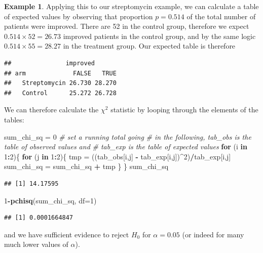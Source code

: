 \documentclass[
  openany]{book}
\newenvironment{Shaded}{\begin{snugshade}}{\end{snugshade}}
\newcommand{\AttributeTok}[1]{\textcolor[rgb]{0.13,0.29,0.53}{#1}}
\newcommand{\CommentTok}[1]{\textcolor[rgb]{0.56,0.35,0.01}{\textit{#1}}}
\newcommand{\ControlFlowTok}[1]{\textcolor[rgb]{0.13,0.29,0.53}{\textbf{#1}}}
\newcommand{\DecValTok}[1]{\textcolor[rgb]{0.00,0.00,0.81}{#1}}
\newcommand{\FunctionTok}[1]{\textcolor[rgb]{0.13,0.29,0.53}{\textbf{#1}}}
\newcommand{\NormalTok}[1]{#1}
\newcommand{\OtherTok}[1]{\textcolor[rgb]{0.56,0.35,0.01}{#1}}
\newcommand{\SpecialCharTok}[1]{\textcolor[rgb]{0.81,0.36,0.00}{\textbf{#1}}}
\theoremstyle{definition}
\theoremstyle{definition}
\newtheorem{example}{Example}[chapter]
\theoremstyle{definition}
\theoremstyle{definition}
\theoremstyle{remark}
\begin{document}
\begin{example}
Applying this to our streptomycin example, we can calculate a table of expected values by observing that proportion \(p=0.514\) of the total number of patients were improved. There are 52 in the control group, therefore we expect \(0.514\times 52 = 26.73\) improved patients in the control group, and by the same logic \(0.514\times 55 = 28.27\) in the treatment group. Our expected table is therefore

\begin{verbatim}
##               improved
## arm             FALSE   TRUE
##   Streptomycin 26.730 28.270
##   Control      25.272 26.728
\end{verbatim}

We can therefore calculate the \(\chi^2\) statistic by looping through the elements of the tables:

\begin{Shaded}
\begin{Highlighting}[]
\NormalTok{sum\_chi\_sq }\OtherTok{=} \DecValTok{0} \CommentTok{\# set a running total going }
\CommentTok{\# in the following, tab\_obs is the table of observed values and}
\CommentTok{\# tab\_exp is the table of expected values}
\ControlFlowTok{for}\NormalTok{ (i }\ControlFlowTok{in} \DecValTok{1}\SpecialCharTok{:}\DecValTok{2}\NormalTok{)\{}
  \ControlFlowTok{for}\NormalTok{ (j }\ControlFlowTok{in} \DecValTok{1}\SpecialCharTok{:}\DecValTok{2}\NormalTok{)\{}
\NormalTok{    tmp }\OtherTok{=}\NormalTok{ ((tab\_obs[i,j] }\SpecialCharTok{{-}}\NormalTok{ tab\_exp[i,j])}\SpecialCharTok{\^{}}\DecValTok{2}\NormalTok{)}\SpecialCharTok{/}\NormalTok{tab\_exp[i,j]}
\NormalTok{    sum\_chi\_sq }\OtherTok{=}\NormalTok{ sum\_chi\_sq }\SpecialCharTok{+}\NormalTok{ tmp}
\NormalTok{  \}}
\NormalTok{\}}
\NormalTok{sum\_chi\_sq}
\end{Highlighting}
\end{Shaded}

\begin{verbatim}
## [1] 14.17595
\end{verbatim}

\begin{Shaded}
\begin{Highlighting}[]
\DecValTok{1}\SpecialCharTok{{-}}\FunctionTok{pchisq}\NormalTok{(sum\_chi\_sq, }\AttributeTok{df=}\DecValTok{1}\NormalTok{)}
\end{Highlighting}
\end{Shaded}

\begin{verbatim}
## [1] 0.0001664847
\end{verbatim}

and we have sufficient evidence to reject \(H_0\) for \(\alpha=0.05\) (or indeed for many much lower values of \(\alpha\)).
\end{example}
\end{document}

